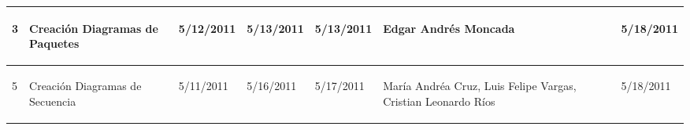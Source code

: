 \begin{center}
\begin{longtable}{|p{}|p{}|p{}|p{}|p{}|p{}|p{}|p{}|}
{\begin{center} 3 \end{center}} & 
{\begin{center} Creación Diagramas de Paquetes \end{center}} & 
{\begin{center} 5/12/2011 \end{center}} & 
{\begin{center} 5/13/2011 \end{center}} & 
{\begin{center} 5/13/2011 \end{center}} & 
{\begin{center} Edgar Andrés Moncada \end{center}} & 
{\begin{center}  \end{center}} & 
{\begin{center} 5/18/2011 \end{center}}\\
\hline

{\begin{center} 5 \end{center}} & 
{\begin{center} Creación Diagramas de Secuencia\end{center}} & 
{\begin{center} 5/11/2011 \end{center}} & 
{\begin{center} 5/16/2011 \end{center}} & 
{\begin{center} 5/17/2011 \end{center}} & 
{\begin{center} María Andréa Cruz, Luis Felipe Vargas, Cristian Leonardo Ríos \end{center}} & 
{\begin{center}  \end{center}} & 
{\begin{center} 5/18/2011 \end{center}}\\
\hline


\end{longtable}
\end{center}
